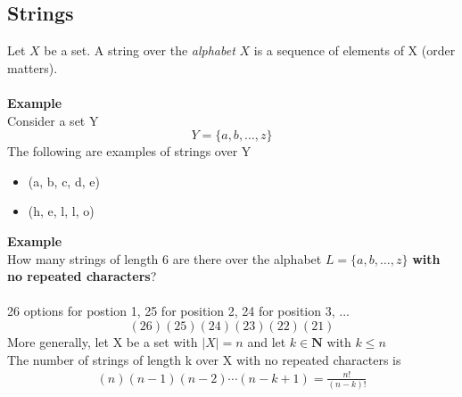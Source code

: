 \documentclass[12pt]{article}
\begin{document}
	\subsection{Strings}
	Let $X$ be a set. A string over the \textit{alphabet} $X$ is a sequence of elements of X (order matters).\\\\
	\textbf{Example}\\
	Consider a set Y
	$$ Y = \{a, b, \ldots, z\} $$
	The following are examples of strings over Y
	\begin{itemize}
		\item (a, b, c, d, e)
		\item (h, e, l, l, o)
	\end{itemize}
	\textbf{Example}\\
	How many strings of length 6 are there over the alphabet $L = \{a, b, \ldots, z\}$ \textbf{with no repeated characters}? \\\\
	26 options for postion 1, 25 for position 2, 24 for position 3, ...
	$$(26)(25)(24)(23)(22)(21)$$
	More generally, let X be a set with $|X| = n$ and let $k \in \mathbf{N}$ with $k \leq n$ \\
	The number of strings of length k over X with no repeated characters is
	\begin{align*}
		(n)(n - 1)(n - 2)\cdots(n - k + 1) = \frac{n!}{(n - k)!}
	\end{align*}
\end{document}
